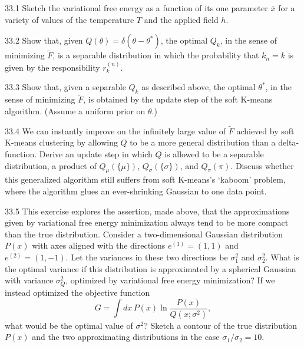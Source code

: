 \documentclass[12pt, a4paper]{article}
\begin{document}
\begin{prob}{33.1}
Sketch the variational free energy as a function of its one parameter $\bar{x}$ for a variety of values of the temperature $T$ and the applied field $h$.
\end{prob}
\begin{sol}
\end{sol}
\bigskip

\begin{prob}{33.2}
Show that, given $Q(\theta) = \delta(\theta - \theta^\ast)$, the optimal $Q_k$, in the sense of minimizing $\tilde{F}$, is a separable distribution in which the probability that $k_n = k$ is given by the responsibility $r_k^{(n)}$.
\end{prob}
\begin{sol}
\end{sol}
\bigskip

\begin{prob}{33.3}
Show that, given a separable $Q_k$ as described above, the optimal $\theta^\ast$, in the sense of minimizing $\tilde{F}$, is obtained by the update step of the soft K-means algorithm. (Assume a uniform prior on $\theta$.)
\end{prob}
\begin{sol}
\end{sol}
\bigskip

\begin{prob}{33.4}
We can instantly improve on the infinitely large value of $\tilde{F}$ achieved by soft K-means clustering by allowing $Q$ to be a more general distribution than a delta-function. Derive an update step in which $Q$ is allowed to be a separable distribution, a product of $Q_{\mu}(\{\mu\})$, $Q_{\sigma}(\{\sigma\})$, and $Q_{\pi}(\pi)$. Discuss whether this generalized algorithm still suffers from soft K-means’s `kaboom' problem, where the algorithm glues an ever-shrinking Gaussian to one data point.
\end{prob}
\begin{sol}
\end{sol}
\bigskip

\begin{prob}{33.5}
This exercise explores the assertion, made above, that the approximations given by variational free energy minimization always tend to be more compact than the true distribution. Consider a two-dimensional Gaussian distribution $P(x)$ with axes aligned with the directions $e^{(1)}=(1,1)$ and $e^{(2)}=(1,-1)$. Let the variances in these two directions be $\sigma_1^2$ and $\sigma_2^2$. What is the optimal variance if this distribution is approximated by a spherical Gaussian with variance $\sigma_Q^2$, optimized by variational free energy minimization? If we instead optimized the objective function
\[
G = \int dx\, P(x)\ln \frac{P(x)}{Q(x;\sigma^2)},
\]
what would be the optimal value of $\sigma^2$? Sketch a contour of the true distribution $P(x)$ and the two approximating distributions in the case $\sigma_1/\sigma_2 = 10$.
\end{prob}
\begin{sol}
\end{sol}
\bigskip
\end{document}
